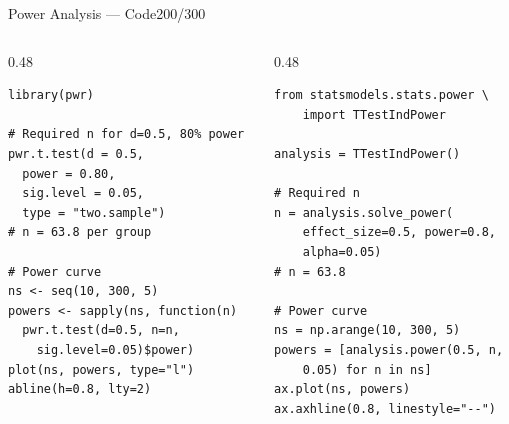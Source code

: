 \documentclass[10pt]{beamer}
\newcommand{\smark}[1]{\hfill{\scriptsize\color{codegray}#1}}
\begin{document}
\begin{frame}[fragile]{Power Analysis --- Code}\smark{200/300}
\begin{columns}[T]
\begin{column}{0.48\textwidth}
\begin{lstlisting}[style=Rstyle]
library(pwr)

# Required n for d=0.5, 80% power
pwr.t.test(d = 0.5,
  power = 0.80,
  sig.level = 0.05,
  type = "two.sample")
# n = 63.8 per group

# Power curve
ns <- seq(10, 300, 5)
powers <- sapply(ns, function(n)
  pwr.t.test(d=0.5, n=n,
    sig.level=0.05)$power)
plot(ns, powers, type="l")
abline(h=0.8, lty=2)
\end{lstlisting}
\end{column}
\begin{column}{0.48\textwidth}
\begin{lstlisting}[style=Pystyle]
from statsmodels.stats.power \
    import TTestIndPower

analysis = TTestIndPower()

# Required n
n = analysis.solve_power(
    effect_size=0.5, power=0.8,
    alpha=0.05)
# n = 63.8

# Power curve
ns = np.arange(10, 300, 5)
powers = [analysis.power(0.5, n,
    0.05) for n in ns]
ax.plot(ns, powers)
ax.axhline(0.8, linestyle="--")
\end{lstlisting}
\end{column}
\end{columns}
\end{frame}
\end{document}
